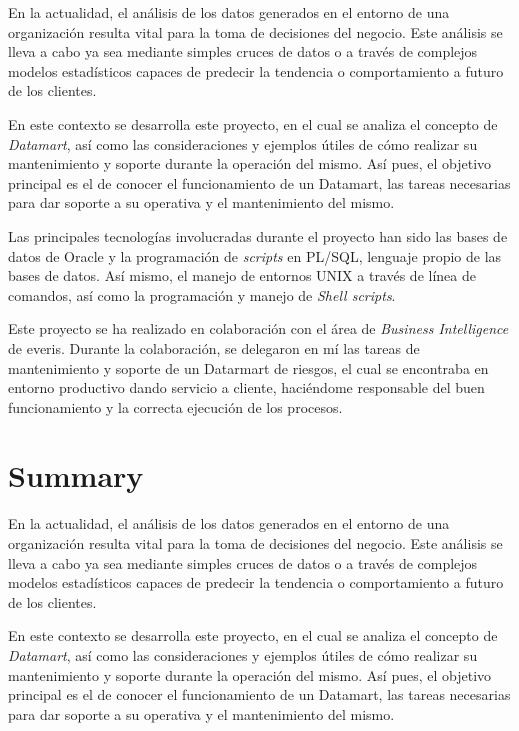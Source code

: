 \documentclass[a4paper, 12pt]{book}
\begin{document}
En la actualidad, el análisis de los datos generados en el entorno de una organización resulta vital para la toma de decisiones del negocio. Este análisis se lleva a cabo ya sea mediante simples cruces de datos o a través de complejos modelos estadísticos capaces de predecir la tendencia o comportamiento a futuro de los clientes.

En este contexto se desarrolla este proyecto, en el cual se analiza el concepto de \textit{Datamart}, así como las consideraciones y ejemplos útiles de cómo realizar su mantenimiento y soporte durante la operación del mismo. Así pues, el objetivo principal es el de conocer el funcionamiento de un Datamart, las tareas necesarias para dar soporte a su operativa y el mantenimiento del mismo.

Las principales tecnologías involucradas durante el proyecto han sido las bases de datos de Oracle y la programación de \textit{scripts} en PL/SQL, lenguaje propio de las bases de datos. Así mismo, el manejo de entornos UNIX a través de línea de comandos, así como la programación y manejo de \textit{Shell scripts}.

Este proyecto se ha realizado en colaboración con el área de \textit{Business Intelligence} de everis. Durante la colaboración, se delegaron en mí las tareas de mantenimiento y soporte de un Datarmart de riesgos, el cual se encontraba en entorno productivo dando servicio a cliente, haciéndome responsable del buen funcionamiento y la correcta ejecución de los procesos. 


\chapter*{Summary}

En la actualidad, el análisis de los datos generados en el entorno de una organización resulta vital para la toma de decisiones del negocio. Este análisis se lleva a cabo ya sea mediante simples cruces de datos o a través de complejos modelos estadísticos capaces de predecir la tendencia o comportamiento a futuro de los clientes.

En este contexto se desarrolla este proyecto, en el cual se analiza el concepto de \textit{Datamart}, así como las consideraciones y ejemplos útiles de cómo realizar su mantenimiento y soporte durante la operación del mismo. Así pues, el objetivo principal es el de conocer el funcionamiento de un Datamart, las tareas necesarias para dar soporte a su operativa y el mantenimiento del mismo.
\end{document}
